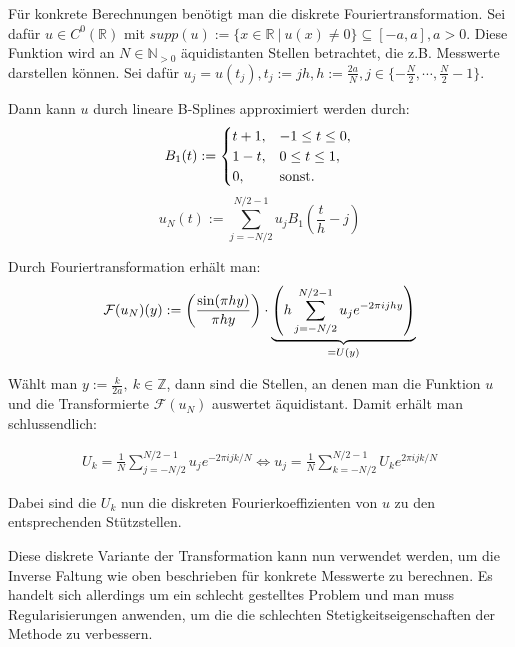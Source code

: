 \documentclass{article}
\newcommand{\R}[0]{\mathbb{R}}
\theoremstyle{plain}
\theoremstyle{definition}
\begin{document}
Für konkrete Berechnungen benötigt man die diskrete Fouriertransformation. 
Sei dafür $u \in C^0(\R)$ mit $supp(u) := \{x \in \R \: | \: u(x) \neq 0 \} \subseteq [-a, a], a > 0$. Diese Funktion wird an $N \in \mathbb{N}_{>0}$ äquidistanten Stellen betrachtet, 
die z.B. Messwerte darstellen können. Sei dafür $u_j = u(t_j), t_j := jh, h:= \frac{2a}{N}, j \in \{-\frac{N}{2}, \cdots, \frac{N}{2} - 1\}$.

Dann kann $u$ durch lineare B-Splines approximiert werden durch:
\begin{equation}
    B_1(t) := \begin{cases}
        t + 1, &-1 \leq t \leq 0, \\
        1 - t, &0 \leq t \leq 1, \\
        0, &{\rm sonst}.
    \end{cases} \\
\end{equation}
\begin{equation}
    u_N(t) := \sum\limits_{j=-N/2}^{N/2-1} u_j B_1 \left(\frac{t}{h} - j\right)
\end{equation}

Durch Fouriertransformation erhält man:
\begin{equation}
    \mathcal{F}(u_N)(y) := \left(\frac{{\rm sin}(\pi h y)}{\pi h y}\right) \cdot \underbrace{\left(h \sum\limits_{j=-N/2}^{N/2-1} u_j e^{-2\pi i jhy}\right)}_{=U(y)}
\end{equation}

Wählt man $y := \frac{k}{2a}, \: k \in \mathbb{Z}$, dann sind die Stellen, an denen man die Funktion $u$ und die Transformierte $\mathcal{F}(u_N)$
auswertet äquidistant. Damit erhält man schlussendlich:

\begin{align}
    U_k = \frac{1}{N} \sum\limits_{j=-N/2}^{N/2-1} u_j e^{-2\pi ijk/N}
\iff u_j = \frac{1}{N} \sum\limits_{k=-N/2}^{N/2-1} U_k e^{2\pi ijk/N}
\end{align}

Dabei sind die $U_k$ nun die diskreten Fourierkoeffizienten von $u$ zu den entsprechenden Stützstellen.

Diese diskrete Variante der Transformation kann nun verwendet werden, um die Inverse Faltung wie oben beschrieben für konkrete Messwerte zu berechnen. 
Es handelt sich allerdings um ein schlecht gestelltes Problem und man muss Regularisierungen anwenden, um die die schlechten Stetigkeitseigenschaften der Methode zu verbessern. 
\end{document}
